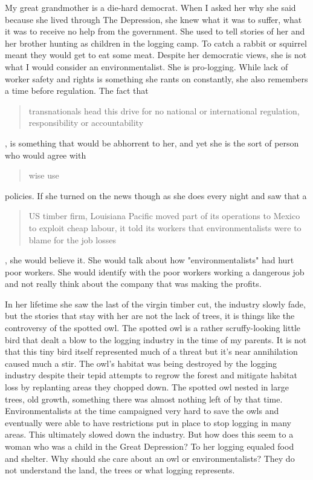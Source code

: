\documentclass[
    a4paper,
    12pt,
    man,
    donotrepeattitle
]{apa6}
\let \cite \parencite
\begin{document}
My great grandmother is a die-hard democrat. When I asked her why she said
because she lived through The Depression, she knew what it was to suffer, what
it was to receive no help from the government. She used to tell stories of her
and her brother hunting as children in the logging camp. To catch a rabbit or
squirrel meant they would get to eat some meat. Despite her democratic views,
she is not what I would consider an environmentalist. She is pro-logging. While
lack of worker safety and rights is something she rants on constantly, she also
remembers a time before regulation. The fact that \blockquote{transnationals head this
drive for no national or international regulation, responsibility or
accountability} \cite[p. 72]{s3}, is something that would be abhorrent to her, and yet
she is the sort of person who would agree with \blockquote{wise use} \cite[p. 88]{s3} policies. If
she turned on the news though as she does every night and saw that
a \blockquote{US timber
firm, Louisiana Pacific moved part of its operations to Mexico to exploit cheap
labour, it told its workers that environmentalists were to blame for the job
losses} \cite[p. 94]{s3}, she would believe it. She would talk about how
"environmentalists" had hurt poor workers. She would identify with the poor
workers working a dangerous job and not really think about the company that was
making the profits.

In her lifetime she saw the last of the virgin timber cut, the industry slowly
fade, but the stories that stay with her are not the lack of trees, it is
things like the controversy of the spotted owl. The spotted owl is a rather
scruffy-looking little bird that dealt a blow to the logging industry in the
time of my parents. It is not that this tiny bird itself represented much of
a threat but it's near annihilation caused much a stir. The owl's habitat
was being destroyed by the logging industry despite their tepid attempts to
regrow the forest and mitigate habitat loss by replanting areas they chopped 
down. The spotted owl
nested in large trees, old growth, something there was almost nothing left of
by that time. Environmentalists at the time campaigned very hard to save the
owls and eventually were able to have restrictions put in place to stop logging
in many areas. This ultimately slowed down the industry. But how does this 
seem to
a woman who was a child in the Great Depression? To her logging equaled food 
and shelter. Why should she care about an owl or environmentalists? They do not
understand the land, the trees or what logging represents.
\end{document}
